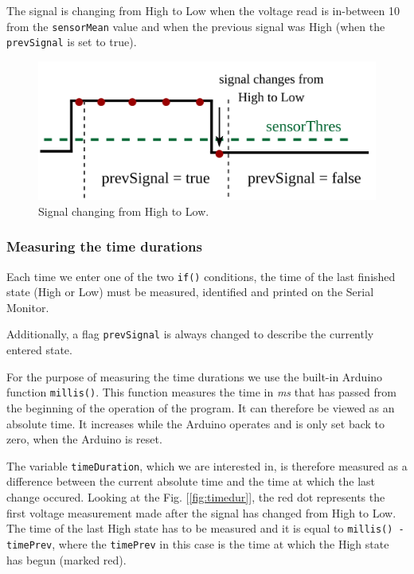 \documentclass[12pt]{report}
\begin{document}
The signal is changing from High to Low when the voltage read is in-between 10 from the \verb|sensorMean| value and when the previous signal was High (when the \verb|prevSignal| is set to true). 

\begin{figure}[H]
\centering\includegraphics[scale=0.18]{hightolow}
\caption{Signal changing from High to Low.}				
\label{fig:arduino_code}
\end{figure}

\subsubsection{Measuring the time durations}

Each time we enter one of the two \verb|if()| conditions, the time of the last finished state (High or Low) must be measured, identified and printed on the Serial Monitor.

Additionally, a flag \verb|prevSignal| is always changed to describe the currently entered state.

For the purpose of measuring the time durations we use the built-in Arduino function \verb|millis()|. This function measures the time in \textit{ms} that has passed from the beginning of the operation of the program. It can therefore be viewed as an absolute time. It increases while the Arduino operates and is only set back to zero, when the Arduino is reset.

The variable \verb|timeDuration|, which we are interested in, is therefore measured as a difference between the current absolute time and the time at which the last change occured. Looking at the Fig. [\ref{fig:timedur}], the red dot represents the first voltage measurement made after the signal has changed from High to Low. The time of the last High state has to be measured and it is equal to \verb|millis() - timePrev|, where the 
\verb|timePrev| in this case is the time at which the High state has begun (marked red).
\end{document}
